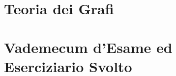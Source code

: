 \documentclass[11pt,a4paper,twoside,openright]{book}
\begin{document}
\part{Teoria dei Grafi}


\part{Vademecum d'Esame ed Eserciziario Svolto}


\end{document}
